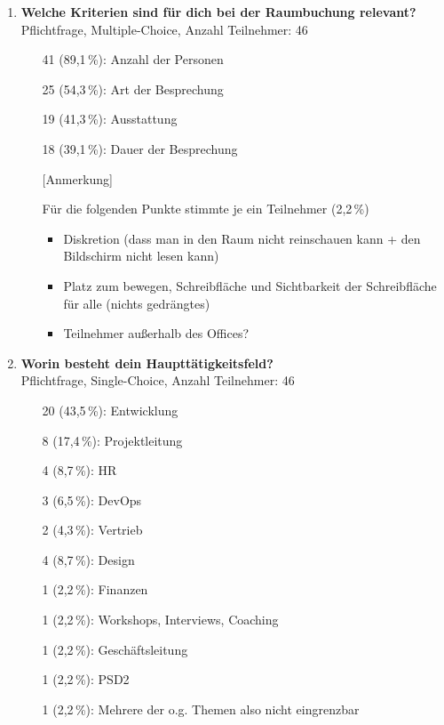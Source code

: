 \begin{enumerate}
    \item \textbf{Welche Kriterien sind für dich bei der Raumbuchung relevant?} \\ 
    Pflichtfrage, Multiple-Choice, Anzahl Teilnehmer: 46
    \begin{itemize}
        \item[] 41 (89,1\,\%): Anzahl der Personen
        \item[] 25 (54,3\,\%): Art der Besprechung
        \item[] 19 (41,3\,\%): Ausstattung
        \item[] 18 (39,1\,\%): Dauer der Besprechung
        \item[] [Anmerkung]
        \item[] Für die folgenden Punkte stimmte je ein Teilnehmer (2,2\,\%)
        \begin{itemize}
            \item Diskretion (dass man in den Raum nicht reinschauen kann + den Bildschirm nicht lesen kann)
            \item Platz zum bewegen, Schreibfläche und Sichtbarkeit der Schreibfläche für alle (nichts gedrängtes)
            \item Teilnehmer außerhalb des Offices?
        \end{itemize}
    \end{itemize}
    
    \item \textbf{Worin besteht dein Haupttätigkeitsfeld?} \\ 
    Pflichtfrage, Single-Choice, Anzahl Teilnehmer: 46
    \begin{itemize}
        \item[] 20 (43,5\,\%): Entwicklung
        \item[] 8 (17,4\,\%): Projektleitung
        \item[] 4 (8,7\,\%): HR
        \item[] 3 (6,5\,\%): DevOps
        \item[] 2 (4,3\,\%): Vertrieb
        \item[] 4 (8,7\,\%): Design
        \item[] 1 (2,2\,\%): Finanzen
        \item[] 1 (2,2\,\%): Workshops, Interviews, Coaching
        
        \item[] 1 (2,2\,\%): Geschäftsleitung
        \item[] 1 (2,2\,\%): PSD2
        \item[] 1 (2,2\,\%): Mehrere der o.g. Themen also nicht eingrenzbar
    \end{itemize}
    

\end{enumerate}
